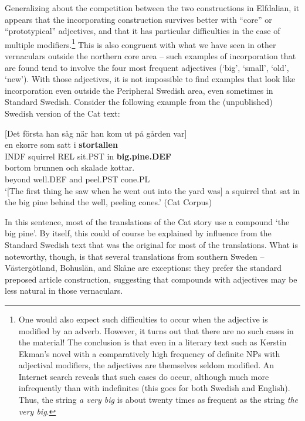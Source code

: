 Generalizing about the competition between the two constructions in Elfdalian, it appears that the incorporating construction survives better with “core” or “prototypical” adjectives, and that it has particular difficulties in the case of multiple modifiers.\footnote{ One would also expect such difficulties to occur when the adjective is modified by an adverb. However, it turns out that there are no such cases in the material! The conclusion is that even in a literary text such as Kerstin Ekman’s novel with a comparatively high frequency of definite NPs with adjectival modifiers, the adjectives are themselves seldom modified. An Internet search reveals that such cases do occur, although much more infrequently than with indefinites (this goes for both Swedish and English). Thus, the string \textit{a very big} is about twenty times as frequent as the string \textit{the very big}.} This is also congruent with what we have seen in other vernaculars outside the northern core area – such examples of incorporation that are found tend to involve the four most frequent adjectives (‘big’, ‘small’, ‘old’, ‘new’). With those adjectives, it is not impossible to find examples that look like incorporation even outside the Peripheral Swedish area, even sometimes in Standard Swedish. Consider the following example from the (unpublished) Swedish version of the Cat text:


\ea\label{}
{}[Det första han såg när han kom ut på gården var]\\
\gll en  ekorre  som  satt  i  \textbf{stortallen}\\
INDF  squirrel  REL  sit.PST  in  \textbf{big.pine.DEF}\\
\gll bortom  brunnen  och  skalade  kottar.\\
beyond  well.DEF  and  peel.PST  cone.PL\\
\glt ‘[The first thing he saw when he went out into the yard was] a squirrel that sat in the big pine behind the well, peeling cones.’ (Cat Corpus)
\z

In this sentence, most of the translations of the Cat story use a compound  ‘the big pine’. By itself, this could of course be explained by influence from the Standard Swedish text that was the original for most of the translations. What is noteworthy, though, is that several translations from southern Sweden – Västergötland, Bohuslän, and Skåne are exceptions: they prefer the standard preposed article construction, suggesting that compounds with adjectives may be less natural in those vernaculars.

